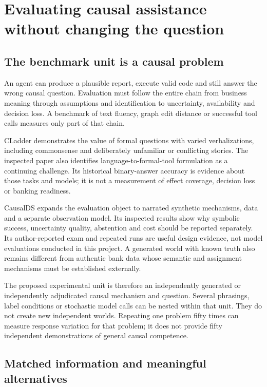 \chapter{Evaluating causal assistance without changing the question}
\label{la:evaluation}

\section{The benchmark unit is a causal problem}

An agent can produce a plausible report, execute valid code and still answer
the wrong causal question. Evaluation must follow the entire chain from
business meaning through assumptions and identification to uncertainty,
availability and decision loss. A benchmark of text fluency, graph edit
distance or successful tool calls measures only part of that chain.

CLadder demonstrates the value of formal questions with varied verbalizations,
including commonsense and deliberately unfamiliar or conflicting stories.
The inspected paper also identifies language-to-formal-tool formulation as
a continuing challenge. Its historical binary-answer accuracy is evidence
about those tasks and models; it is not a measurement of effect coverage,
decision loss or banking readiness.\cite{v12_la_2312_04350}

CausalDS expands the evaluation object to narrated synthetic mechanisms,
data and a separate observation model. Its inspected results show why
symbolic success, uncertainty quality, abstention and cost should be reported
separately. Its author-reported exam and repeated runs are useful design
evidence, not model evaluations conducted in this project. A generated world
with known truth also remains different from authentic bank data whose
semantic and assignment mechanisms must be established externally.
\cite{v12_la_2607_08093}

The proposed experimental unit is therefore an independently generated or
independently adjudicated causal mechanism and question. Several phrasings,
label conditions or stochastic model calls can be nested within that unit.
They do not create new independent worlds. Repeating one problem fifty times
can measure response variation for that problem; it does not provide fifty
independent demonstrations of general causal competence.

\section{Matched information and meaningful alternatives}

